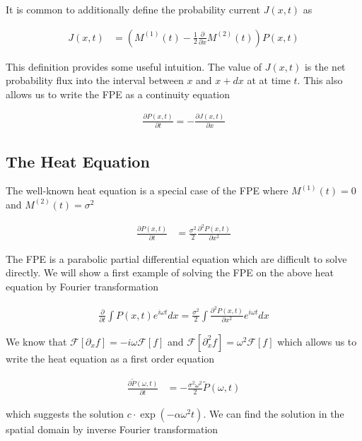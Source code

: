 \documentclass{article}
\begin{document}
It is common to additionally define the probability current $J(x,t)$ as 

\begin{align}
J(x,t)  &= \left(M^{(1)}(t) - \frac{1}{2}\frac{\partial}{\partial x}M^{(2)}(t)\right)P(x,t)
\end{align}

This definition provides some useful intuition. The value of $J(x,t)$ is the net probability flux into the interval between $x$ and $x+dx$ at at time $t$. This also allows us to write the FPE as a continuity equation

\begin{align}
\frac{\partial P(x,t)}{\partial t} = -\frac{\partial J(x,t)}{\partial x}
\end{align}

\subsection{The Heat Equation}

The well-known heat equation is a special case of the FPE where $M^{(1)}(t) = 0$ and $M^{(2)}(t) = \sigma^{2}$

\begin{align}
\frac{\partial P(x,t)}{\partial t}  &= \frac{\sigma^{2}}{2}\frac{\partial^{2}P(x,t)}{\partial x^{2}}
\end{align}

The FPE is a parabolic partial differential equation which are difficult to solve directly. We will show a first example of solving the FPE on the above heat equation by Fourier transformation

\begin{align}
\frac{\partial}{\partial t} \int  P(x,t) e^{i\omega t}dx = \frac{\sigma^{2}}{2}\int \frac{\partial^{2}P(x,t)}{\partial x^{2}} e^{i\omega t}dx
\end{align}

We know that $\mathcal{F}[\partial_{x}f] = -i\omega \mathcal{F}[f]$ and $\mathcal{F}[\partial_{x}^{2}f] = \omega^{2} \mathcal{F}[f]$ which allows us to write the heat equation as a first order equation

\begin{align}
\frac{\partial \tilde{P}(\omega,t)}{\partial t}  &= -\frac{\sigma^{2}\omega^{2}}{2}\tilde{P}(\omega,t)
\end{align}

which suggests the solution $c\cdot\exp\left(-\alpha\omega^{2}t\right)$. We can find the solution in the spatial domain by inverse Fourier transformation
\end{document}
